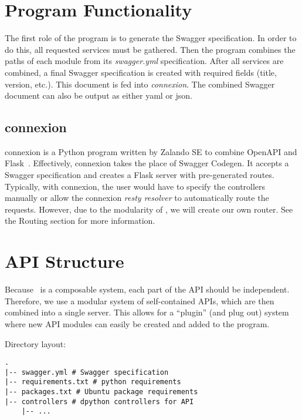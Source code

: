 \section{Program Functionality}

The first role of the program is to generate the Swagger specification. In
order to do this, all requested services must be gathered. Then the
program combines the paths of each module from its \textit{swagger.yml}
specification. After all services are combined, a final Swagger specification
is created with required fields (title, version, etc.). This document is fed
into \textit{connexion}. The combined Swagger document can also be output
as either yaml or json.

\subsection{connexion}

connexion is a Python program written by Zalando SE to combine OpenAPI and
Flask~\cite{hid-sp18-526-www-connexion}. Effectively, connexion takes the
place of Swagger Codegen. It accepts a Swagger specification and creates
a Flask server with pre-generated routes. Typically, with connexion, the
user would have to specify the controllers manually or allow the connexion
\textit{resty resolver} to automatically route the requests. However, due
to the modularity of \projectname, we will create our own router. See the
Routing section for more information.

\section{API Structure}

Because \projectname~is a composable system, each part of the API should
be independent. Therefore, we use a modular system of self-contained APIs,
which are then combined into a single server. This allows for a ``plugin''
(and plug out) system where new API modules can easily be created and added
to the program.

Directory layout:
\begin{verbatim}
.
|-- swagger.yml # Swagger specification
|-- requirements.txt # python requirements
|-- packages.txt # Ubuntu package requirements
|-- controllers # dpython controllers for API
    |-- ...

\end{verbatim}

